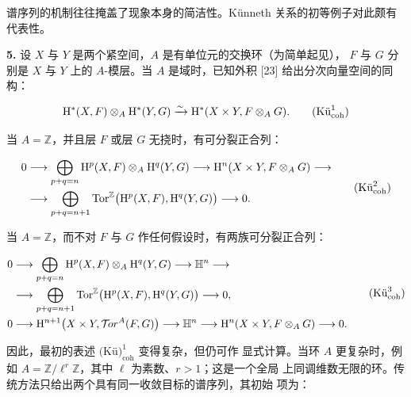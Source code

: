 \clearpage
{}
谱序列的机制往往掩盖了现象本身的简洁性。Künneth 关系的初等例子对此颇有
代表性。

\noindent\textbf{5.}\quad
设 $X$ 与 $Y$ 是两个紧空间，$A$ 是有单位元的交换环（为简单起见），
$F$ 与 $G$ 分别是 $X$ 与 $Y$ 上的 $A$-模层。当 $A$ 是域时，已知外积
[23] 给出分次向量空间的同构：

\begin{equation}
\mathrm H^*(X,F)\otimes_A\mathrm H^*(Y,G)
\xrightarrow{\sim}
\mathrm H^*(X\times Y,F\otimes_A G).
\tag{$\text{Kü}_{\mathrm{coh}}^{1}$}
\end{equation}

当 $A=\mathbb Z$，并且层 $F$ 或层 $G$ 无挠时，有可分裂正合列：

\begin{equation}
\begin{aligned}
0 &\longrightarrow
\bigoplus_{p+q=n}\mathrm H^p(X,F)\otimes_A\mathrm H^q(Y,G)
\longrightarrow \mathrm H^n(X\times Y,F\otimes_A G) \longrightarrow \\
&\longrightarrow
\bigoplus_{p+q=n+1}
\operatorname{Tor}^{\mathbb Z}\bigl(\mathrm H^p(X,F),\mathrm H^q(Y,G)\bigr)
\longrightarrow 0.
\end{aligned}
\tag{$\text{Kü}_{\mathrm{coh}}^{2}$}
\end{equation}

当 $A=\mathbb Z$，而不对 $F$ 与 $G$ 作任何假设时，有两族可分裂正合列：

\begin{equation}
\begin{aligned}
0 &\longrightarrow
\bigoplus_{p+q=n}\mathrm H^p(X,F)\otimes_A\mathrm H^q(Y,G)
\longrightarrow \mathbb H^n \longrightarrow \\
&\longrightarrow
\bigoplus_{p+q=n+1}
\operatorname{Tor}^{\mathbb Z}\bigl(\mathrm H^p(X,F),\mathrm H^q(Y,G)\bigr)
\longrightarrow 0, \\
0 &\longrightarrow
\mathrm H^{n+1}\bigl(X\times Y,\mathcal T\!or^A(F,G)\bigr)
\longrightarrow \mathbb H^n
\longrightarrow \mathrm H^n(X\times Y,F\otimes_A G)
\longrightarrow 0.
\end{aligned}
\tag{$\text{Kü}_{\mathrm{coh}}^{3}$}
\end{equation}

因此，最初的表述 $\text{(Kü)}_{\mathrm{coh}}^{1}$ 变得复杂，但仍可作
显式计算。当环 $A$ 更复杂时，例如
$A=\mathbb Z/\ell^r\mathbb Z$，其中 $\ell$ 为素数、$r>1$；这是一个全局
上同调维数无限的环。传统方法只给出两个具有同一收敛目标的谱序列，其初始
项为：

